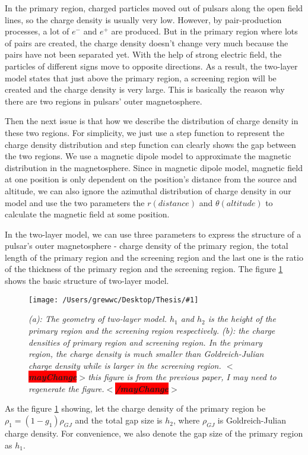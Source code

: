 \documentclass[12pt]{report}
\newcommand{\mycaption}[1]{\caption{\textit{\footnotesize #1}}}
\newcommand{\singleFig}[3]{
 \begin{figure}[!ht]
  \centering
  \texttt{[image: /Users/grewwc/Desktop/Thesis/\#1]}
  \mycaption{#3}
 \label{fig: #1}
 \end{figure}
 \vspace{0.5cm} 
}
\newcommand{\mayChange}[1]{
  $<$\colorbox{red}{\textbf{mayChange}}$>$#1$<$\colorbox{red}{\textbf{/mayChange}}$>$
}
\newcommand{\myComment}[1]{
  \newline
}
\begin{document}
      In the primary region, charged particles moved out of pulsars along the open field lines, 
      so the charge density is usually very low. 
      However, by pair-production processes, a lot of $e^{-}$ and $e^{+}$ are produced. 
      But in the primary region where lots of pairs are created, the charge density doesn't 
      change very much because the pairs have not been separated yet. With the help of strong 
      electric field, the particles of different signs move to opposite directions. 
      As a result, the two-layer model states that just above the primary region, a screening 
      region will be created and the charge density is very large. This is basically the reason why 
      there are two regions in pulsars' outer magnetosphere.

      Then the next issue is that how we describe the distribution of charge density in these two regions. 
      For simplicity, we just use a step function to represent the charge density distribution and step function 
      can clearly shows the gap between the two regions. We use a magnetic dipole model to approximate the 
      magnetic distribution in the magnetosphere. Since in magnetic dipole model, magnetic field at one position is 
      only dependent on the position's distance from the source and altitude, we can also ignore the azimuthal 
      distribution of charge density in our model and use the two parameters
      the $r (distance)$ and $\theta (altitude)$ to calculate the magnetic field at some position.

      In the two-layer model, we can use three parameters to express the structure of a pulsar's outer 
      magnetosphere - charge density of the primary region, the total length of the primary region and the 
      screening region and the last one is the ratio of the thickness of the primary region and the 
      screening region. The figure \ref{fig: charge_density} shows the basic structure of two-layer model. 

      \singleFig{charge_density}{0.6}{(a): The geometry of two-layer model. $h_{1}$ and $h_{2}$ is the height
      of the primary region and the screening region respectively. (b): the charge densities of primary region and 
      screening region. In the primary region, the charge density is much smaller than Goldreich-Julian charge density
      while is larger in the screening region. \mayChange{this figure is from the previous paper, I may need to 
      regenerate the figure.}}

      As the figure \ref{fig: charge_density} showing, 
      let the charge density of the primary region be $\rho_1 = (1-g_{1}) \rho_{GJ}$ and the total gap size is 
      $h_{2}$, where $\rho_{GJ}$ is Goldreich-Julian charge density. For convenience, 
      we also denote the gap size of the primary region as $h_{1}$. 
      \myComment{Then we can calculate electric potential and electric field by solving the Poisson equation }
\end{document}
